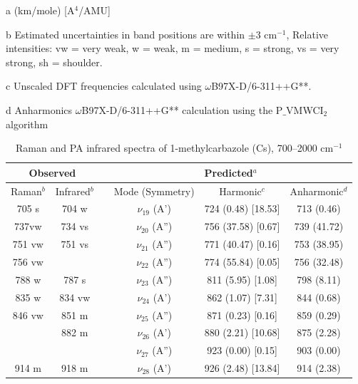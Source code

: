 \begin{table}[H]
\begin{center}
\begin{threeparttable}
\begin{tabular}{c c c c c c}
\end{tabular}

\begin{tablenotes}
	\item[a] (km/mole) [A$^{4}$/AMU]
	\item[b] Estimated uncertainties in band positions are within $\pm$3 cm$^{-1}$, Relative intensities: vw = very weak, w = weak, m = medium, s = strong, vs = very strong, sh = shoulder.
	\item[c] Unscaled DFT frequencies calculated using $\omega$B97X-D/6-311++G**.
	\item[d] Anharmonics $\omega$B97X-D/6-311++G** calculation using the P$\_$VMWCI$_{2}$ algorithm
\end{tablenotes}
\end{threeparttable}
\end{center}
\label{lowfreq-1-methylcarbazole}
\end{table}	


	\begin{table}[H]
		\caption{Raman and PA infrared spectra of 1-methylcarbazole (Cs), 700–2000 cm$^{-1}$}
		\begin{center}
			\begin{tabular}{c c c c c c}
				\hline
				\multicolumn{ 2}{c}{Observed} & \multicolumn{1}{c}{} & \multicolumn{ 3}{c}{Predicted$^{a}$} \\ \hline
				Raman$^{b}$ & \multicolumn{1}{c}{Infrared$^{b}$} &  & \multicolumn{1}{c}{Mode (Symmetry)} & \multicolumn{1}{c}{Harmonic$^{c}$} & Anharmonic$^{d}$ \\ \hline
				705 s & 704 w &  & $\nu_{19}$ (A’) & 724 (0.48) [18.53] & 713 (0.46) \\ 
737vw & 734 vs &  & $\nu_{20}$ (A”) & 756 (37.58) [0.67] & 739 (41.72) \\
751 vw & 751 vs &  & $\nu_{21}$ (A”) & 771 (40.47) [0.16] & 753 (38.95) \\
756 vw &  &  & $\nu_{22}$ (A”) & 774 (55.84) [0.05] & 756 (32.48) \\
788 w & 787 s &  & $\nu_{23}$ (A”) & 811 (5.95) [1.08] & 798 (8.11) \\ 
835 w & 834 vw &  & $\nu_{24}$ (A’) & 862 (1.07) [7.31] & 844 (0.68) \\ 
846 vw& 851 m&  & $\nu_{25}$ (A”)& 871 (0.23) [0.16] & 859 (0.29)\\ 
& 882 m&  & $\nu_{26}$ (A’)  & 880 (2.21) [10.68] & 875 (2.28) \\ 
&  &  & $\nu_{27}$ (A”) & 923 (0.00) [0.15] & 903 (0.00) \\
914 m & 918 m &  & $\nu_{28}$ (A’) & 926 (2.48) [13.84] & 914 (2.38) \\ 
\bottomrule
\end{tabular}
\end{center}
\end{table}




